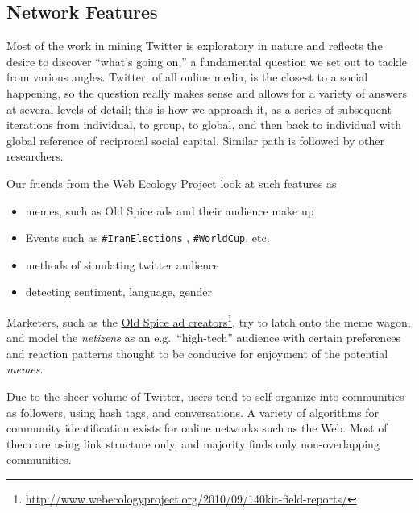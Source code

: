 \documentclass[10pt,oneside]{memoir}
\begin{document}
\begin{Spacing}{2}
\pagebreak \section{Network Features}
\label{networkfeatures}

Most of the work in mining Twitter is exploratory in nature and reflects the desire to discover ``what's going on,'' a fundamental question we set out to tackle from various angles.  Twitter, of all online media, is the closest to a social happening, so the question really makes sense and allows for a variety of answers at several levels of detail; this is how we approach it, as a series of subsequent iterations from individual, to group, to global, and then back to individual with global reference of reciprocal social capital.  Similar path is followed by other researchers.


Our friends from the Web Ecology Project look at such features as


\begin{itemize}


\item memes, such as Old Spice ads and their audience make up

\item Events such as \texttt{\#IranElections} \cite{Gaffney:2010:IranElections}, \texttt{\#WorldCup}, etc.

\item methods of simulating twitter audience

\item detecting sentiment, language, gender
\end{itemize}

Marketers, such as the \href{http://www.webecologyproject.org/2010/09/140kit-field-reports/}{Old Spice ad creators}\footnote{\href{http://www.webecologyproject.org/2010/09/140kit-field-reports/}{http://www.webecologyproject.org/2010/09/140kit-field-reports/}}, try to latch onto the meme wagon, and model the {\itshape netizens} as an e.g.\ ``high-tech'' audience with certain preferences and reaction patterns thought to be conducive for enjoyment of the potential {\itshape memes}.


Due to the sheer volume of Twitter, users tend to self-organize into communities as followers, using hash tags, and conversations.  A variety of algorithms for community identification exists for online networks such as the Web.  Most of them are using link structure only, and majority finds only non-overlapping communities.



\end{Spacing}
\end{document}

